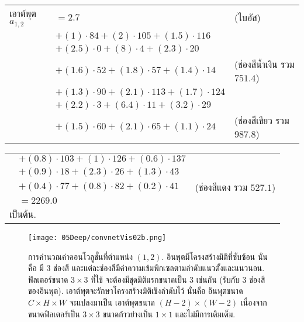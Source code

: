 \begin{tabular}{lll}
	เอาต์พุต $a_{1,2}$ &  $= 2.7$ & (ไบอัส) \\
	& $+ (1) \cdot 84 + (2) \cdot 105 + (1.5) \cdot 116$ & \\
	& $+ (2.5) \cdot 0 + (8) \cdot 4 + (2.3) \cdot 20$ & \\
	& $+ (1.6) \cdot 52 + (1.8) \cdot 57 + (1.4) \cdot 14$ & (ช่องสีน้ำเงิน รวม $751.4$) 
	\\
%	
	&  $+ (1.3) \cdot 90 + (2.1) \cdot 113 + (1.7) \cdot 124$ & \\
	& $+ (2.2) \cdot 3 + (6.4) \cdot 11 + (3.2) \cdot 29$ & \\
	& $+ (1.5) \cdot 60 + (2.1) \cdot 65 + (1.1) \cdot 24$ & (ช่องสีเขียว รวม $987.8$) 
\end{tabular} 

\begin{tabular}{lll}	
	&  $+ (0.8) \cdot 103 + (1) \cdot 126 + (0.6) \cdot 137$ & \\
	& $+ (0.9) \cdot 18 + (2.3) \cdot 26 + (1.3) \cdot 43$ & \\
	& $+ (0.4) \cdot 77 + (0.8) \cdot 82 + (0.2) \cdot 41$ & (ช่องสีแดง รวม $527.1$) \\
	& $ = 2269.0$ & \\
	\multicolumn{3}{l}{เป็นต้น.}
\end{tabular} 

%
\begin{figure}
	\begin{center}
		\texttt{[image: 05Deep/convnetVis02b.png]}
		\caption[การคำนวณค่าคอนโวลูชั่นในข้อมูลที่มีโครงสร้างมิติ]{การคำนวณค่าคอนโวลูชั่นที่ตำแหน่ง $(1,2)$.
			อินพุตมีโครงสร้างมิติที่ซับซ้อน นั่นคือ มี $3$ ช่องสี และแต่ละช่องสีมีค่าความเข้มพิกเซลตามลำดับแนวตั้งและแนวนอน.
			ฟิลเตอร์ขนาด $3 \times 3$ ที่ใช้ จะต้องมีชุดมิติแรกขนาดเป็น $3$ เช่นกัน (รับกับ $3$ ช่องสีของอินพุต).
			เอาต์พุตจะรักษาโครงสร้างมิติเชิงลำดับไว้ 
			นั่นคือ อินพุตขนาด $C \times H \times W$ จะแปลงมาเป็น เอาต์พุตขนาด $(H-2) \times (W-2)$ เนื่องจากขนาดฟิลเตอร์เป็น $3 \times 3$ ขนาดก้าวย่างเป็น $1 \times 1$ และไม่มีการเติมเต็ม. 
		}
		\label{fig: deep convolution illustrating}
	\end{center}
\end{figure}
%

